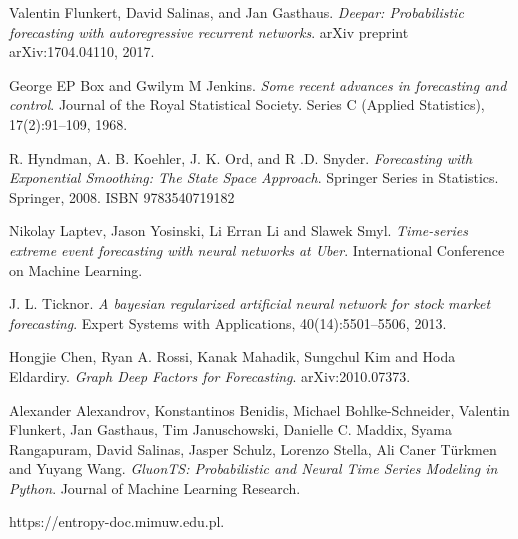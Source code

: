 \documentclass[en]{pracamgr}
\begin{document}
\begin{thebibliography}{99}
 Valentin Flunkert, David Salinas, and Jan Gasthaus. \textit{Deepar: Probabilistic forecasting with autoregressive recurrent networks}. arXiv preprint arXiv:1704.04110, 2017.

 George EP Box and Gwilym M Jenkins. \textit{Some recent advances in forecasting and control}. Journal of the
Royal Statistical Society. Series C (Applied Statistics), 17(2):91–109, 1968.

 R. Hyndman, A. B. Koehler, J. K. Ord, and R .D. Snyder. \textit{Forecasting with Exponential Smoothing: The State Space Approach}. Springer Series in Statistics. Springer, 2008. ISBN
9783540719182

 Nikolay Laptev, Jason Yosinski, Li Erran Li and Slawek Smyl. \textit{Time-series extreme event forecasting with neural networks at Uber}. International Conference on Machine Learning.

 J. L. Ticknor. \textit{A bayesian regularized artificial neural network for stock market forecasting}. Expert Systems with Applications, 40(14):5501–5506, 2013.

 Hongjie Chen, Ryan A. Rossi, Kanak Mahadik, Sungchul Kim and Hoda Eldardiry. \textit{Graph Deep Factors for Forecasting}. arXiv:2010.07373.

 Alexander Alexandrov, Konstantinos Benidis, Michael Bohlke-Schneider, Valentin Flunkert, Jan Gasthaus, Tim Januschowski, Danielle C. Maddix, Syama Rangapuram, David Salinas, Jasper Schulz, Lorenzo Stella,
Ali Caner Türkmen and Yuyang Wang. \textit{GluonTS: Probabilistic and Neural Time Series Modeling in Python}. Journal of Machine Learning Research.

 https://entropy-doc.mimuw.edu.pl.


\end{thebibliography}
\end{document}
